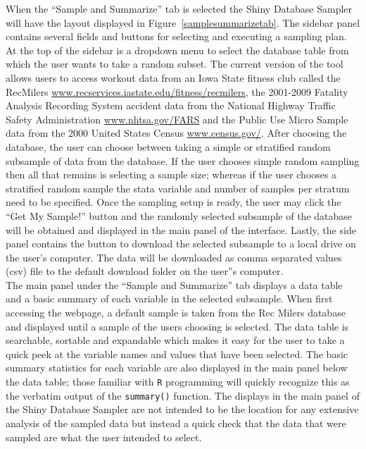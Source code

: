 \documentclass{article}\usepackage[]{graphicx}\usepackage[]{color}
\begin{document}
When the ``Sample and Summarize'' tab is selected the Shiny Database Sampler will have the layout displayed in Figure~\ref{samplesummarizetab}. The sidebar panel contains several fields and buttons for selecting and executing a sampling plan.  At the top of the sidebar is a dropdown menu to select the database table from which the user wants to take a random subset.  The current version of the tool allows users to access workout data from an Iowa State fitness club called the RecMilers \url{www.recservices.iastate.edu/fitness/recmilers}, the 2001-2009 Fatality Analysis Recording System accident data from the National Highway Traffic Safety Administration \url{www.nhtsa.gov/FARS} and the Public Use Micro Sample data from the 2000 United States Census \url{www.census.gov/}.  After choosing the database, the user can choose between taking a simple or stratified random subsample of data from the database.  If the user chooses simple random sampling then all that remains is selecting a sample size; whereas if the user chooses a stratified random sample the stata variable and number of samples per stratum need to be specified.  Once the sampling setup is ready, the user may click the ``Get My Sample!'' button and the randomly selected subsample of the database will be obtained and displayed in the main panel of the interface.  Lastly, the side panel contains the button to download the selected subsample to a local drive on the user's computer.  The data will be downloaded as comma separated values (csv) file to the default download folder on the user''s computer.\\

The main panel under the ``Sample and Summarize'' tab displays a data table and a basic summary of each variable in the selected subsample.  When first accessing the webpage, a default sample is taken from the Rec Milers database and displayed until a sample of the users choosing is selected.  The data table is searchable, sortable and expandable which makes it easy for the user to take a quick peek at the variable names and values that have been selected.  The basic summary statistics for each variable are also displayed in the main panel below the data table; those familiar with \texttt{R} programming will quickly recognize this as the verbatim output of the \texttt{summary()} function.  The displays in the main panel of the Shiny Database Sampler are not intended to be the location for any extensive analysis of the sampled data but instead a quick check that the data that were sampled are what the user intended to select.  \\
\end{document}
